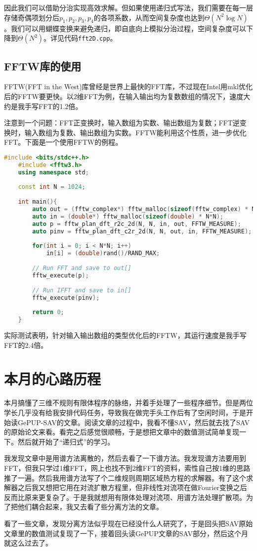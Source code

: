 \documentclass[lang=cn,10pt,bibend=bibtex]{elegantbook}
\begin{document}
因此我们可以借助分治实现高效求解。但如果使用递归式写法，我们需要在每一层存储奇偶项划分后$p_1,p_2,p_3,p_4$的各项系数，从而空间复杂度也达到$\Theta(N^2\log N)$。我们可以用蝴蝶变换来避免递归，即自底向上模拟分治过程，空间复杂度可以下降到$\Theta(N^2)$。详见代码\verb|fft2D.cpp|。

\section{FFTW库的使用}

FFTW(FFT in the West)库曾经是世界上最快的FFT库，不过现在Intel用mkl优化后的FFTW要更快。以2维FFT为例，在输入输出均为复数数组的情况下，速度大约是我手写FFT的1.2倍。

注意到一个问题：FFT正变换时，输入数组为实数、输出数组为复数；FFT逆变换时，输入数组为复数、输出数组为实数。FFTW能利用这个性质，进一步优化FFT。下面是一个使用FFTW的例程。

\begin{lstlisting}[language=c++]
    #include <bits/stdc++.h>
    #include <fftw3.h>
    using namespace std;
    
    const int N = 1024;
    
    int main(){
        auto out = (fftw_complex*) fftw_malloc(sizeof(fftw_complex) * N*(N/2+1));
        auto in = (double*) fftw_malloc(sizeof(double) * N*N);
        auto p = fftw_plan_dft_r2c_2d(N, N, in, out, FFTW_MEASURE);
        auto pinv = fftw_plan_dft_c2r_2d(N, N, out, in, FFTW_MEASURE);
    
        for(int i = 0; i < N*N; i++)
            in[i] = (double)rand()/RAND_MAX;
        
        // Run FFT and save to out[]
        fftw_execute(p);
    
        // Run IFFT and save to in[]
        fftw_execute(pinv);
    
        return 0;
    }
\end{lstlisting}

实际测试表明，针对输入输出数组的类型优化后的FFTW，其运行速度是我手写FFT的2.4倍。

\newpage

\chapter{本月的心路历程}

本月搞懂了三维不规则有限体程序的脉络，并着手处理了一些程序细节。但是两位学长几乎没有给我安排代码任务，导致我在做完手头工作后有了空闲时间，于是开始读GePUP-SAV的文章。阅读文章的过程中，我看不懂SAV，然后就去找了SAV的原始论文来看。看完之后感觉很顺畅，于是想把文章中的数值测试简单复现一下。然后就开始了“递归式”的学习。

我发现文章中是用谱方法离散的，然后去看了一下谱方法。我发现谱方法要用到FFT，但我只学过1维FFT，网上也找不到2维FFT的资料，索性自己按1维的思路推了一遍。然后我用谱方法写了个二维规则周期区域热方程的求解器。有了这个求解器之后我又想把它用在对流扩散方程里，但非线性对流项在做Fourier变换之后反而比原来更复杂了。于是我就想用有限体处理对流项、用谱方法处理扩散项。为了把他们耦合起来，我又去看了些分离方法的文章。

看了一些文章，发现分离方法似乎现在已经没什么人研究了，于是回头把SAV原始文章里的数值测试复现了一下，接着回头读GePUP文章的SAV部分，然后这个月就这么过去了。
\end{document}
